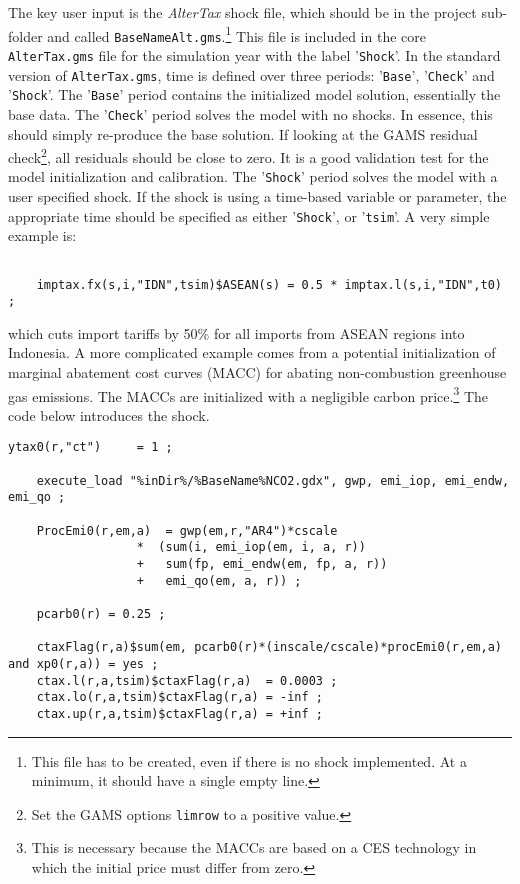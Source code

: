 The key user input is the \emph{AlterTax} shock file, which
should be in the project sub-folder and called
\texttt{BaseNameAlt.gms}.\footnote{This file has to be created, even
if there is no shock implemented. At a minimum, it
should have a single empty line.} This file is
included in the core \texttt{AlterTax.gms} file for the simulation
year with the label '\texttt{Shock}'. In the standard version of
\texttt{AlterTax.gms}, time is defined over three periods:
'\texttt{Base}', '\texttt{Check}' and '\texttt{Shock}'. The '\texttt{Base}'
period contains the initialized model solution, essentially the base data.
The '\texttt{Check}' period solves the model with no shocks. In essence, this should
simply re-produce the base solution. If looking at the GAMS residual
check\footnote{Set the GAMS options \texttt{limrow} to a positive value.},
all residuals should be close to zero. It is a good validation test for
the model initialization and calibration. The '\texttt{Shock}' period
solves the model with a user specified shock. If the shock is
using a time-based variable or parameter, the appropriate time should
be specified as either '\texttt{Shock}', or '\texttt{tsim}'. A very simple
example is:

\begin{verbatim}

    imptax.fx(s,i,"IDN",tsim)$ASEAN(s) = 0.5 * imptax.l(s,i,"IDN",t0) ;

\end{verbatim}

\noindent which cuts import tariffs by 50\% for all imports from
ASEAN regions into Indonesia. A more complicated example comes from
a potential initialization of marginal abatement cost curves (MACC)
for abating non-combustion greenhouse gas emissions. The MACCs are
initialized with a negligible carbon price.\footnote{This is necessary
because the MACCs are based on a CES technology in which the initial
price must differ from zero.} The code below introduces the shock.

\begin{lstlisting}[language=GAMS, caption={Using AlterTax to initialize carbon prices}, label=lst:AlterTaxExample]
    ytax0(r,"ct")     = 1 ;

    execute_load "%inDir%/%BaseName%NCO2.gdx", gwp, emi_iop, emi_endw, emi_qo ;

    ProcEmi0(r,em,a)  = gwp(em,r,"AR4")*cscale
                  *  (sum(i, emi_iop(em, i, a, r))
                  +   sum(fp, emi_endw(em, fp, a, r))
                  +   emi_qo(em, a, r)) ;

    pcarb0(r) = 0.25 ;

    ctaxFlag(r,a)$sum(em, pcarb0(r)*(inscale/cscale)*procEmi0(r,em,a) and xp0(r,a)) = yes ;
    ctax.l(r,a,tsim)$ctaxFlag(r,a)  = 0.0003 ;
    ctax.lo(r,a,tsim)$ctaxFlag(r,a) = -inf ;
    ctax.up(r,a,tsim)$ctaxFlag(r,a) = +inf ;

\end{lstlisting}


